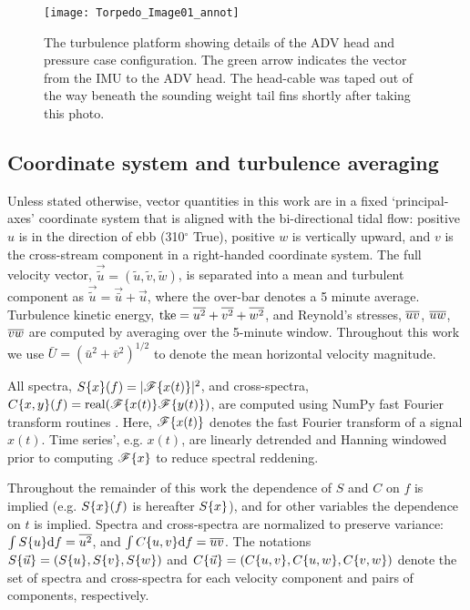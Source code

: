 \begin{figure}[th]
  \centering
  \texttt{[image: Torpedo\_Image01\_annot]}
  \caption{The turbulence platform showing details of the ADV head and pressure case configuration. The green arrow indicates the vector from the IMU to the ADV head. The head-cable was taped out of the way beneath the sounding weight tail fins shortly after taking this photo.}
  \label{fig:torpedo}
\end{figure}

\subsection{Coordinate system and turbulence averaging}

Unless stated otherwise, vector quantities in this work are in a fixed `principal-axes' coordinate system that is aligned with the bi-directional tidal flow: positive $u$ is in the direction of ebb (310$^\circ$ True), positive $w$ is vertically upward, and $v$ is the cross-stream component in a right-handed coordinate system. The full velocity vector, $\vec{\tilde{u}} = (\tilde{u}, \tilde{v}, \tilde{w})$, is separated into a mean and turbulent component as $\vec{\tilde{u}} = \vec{\bar{u}} + \vec{u}$, where the over-bar denotes a 5 minute average. Turbulence kinetic energy, $\mathrm{tke} = \overline{u^2} + \overline{v^2}+\overline{w^2}$, and Reynold's stresses, $\overline{uv}$, $\overline{uw}$, $\overline{vw}$ are computed by averaging over the 5-minute window.  Throughout this work we use $\bar{U} = (\bar{u}^2+\bar{v}^2)^{1/2}$ to denote the mean horizontal velocity magnitude. 

All spectra, $S\{x\}(f)=|\mathscr{F}\{x(t)\}|^2$, and cross-spectra, $C\{x,y\}(f)=\mathrm{real}(\mathscr{F}\{x(t)\}\mathscr{F}\{y(t)\})$, are computed using NumPy fast Fourier transform routines \cite[]{Walt++2011}. Here, $\mathscr{F}\{x(t)\}$ denotes the fast Fourier transform of a signal $x(t)$. Time series', e.g. $x(t)$, are linearly detrended and Hanning windowed prior to computing $\mathscr{F}\{x\}$ to reduce spectral reddening.  

Throughout the remainder of this work the dependence of $S$ and $C$ on $f$ is implied (e.g. $S\{x\}(f)$ is hereafter $S\{x\}$), and for other variables the dependence on $t$ is implied. Spectra and cross-spectra are normalized to preserve variance: $\int S\{u\}\mathrm{d}f = \overline{u^2}$, and  $\int C\{u,v\}\mathrm{d}f = \overline{uv}$. The notations $S\{\vec{u}\}=(S\{u\}, S\{v\}, S\{w\})$ and $C\{\vec{u}\} = (C\{u,v\}, C\{u,w\}, C\{v,w\} )$ denote the set of spectra and cross-spectra for each velocity component and pairs of components, respectively.

